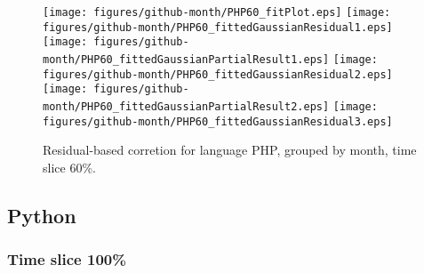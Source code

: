 \begin{figure}[t]
\centering
{}
{\texttt{[image: figures/github-month/PHP60\_fitPlot.eps]}}
{\texttt{[image: figures/github-month/PHP60\_fittedGaussianResidual1.eps]}}
{\texttt{[image: figures/github-month/PHP60\_fittedGaussianPartialResult1.eps]}}
{\texttt{[image: figures/github-month/PHP60\_fittedGaussianResidual2.eps]}}
{\texttt{[image: figures/github-month/PHP60\_fittedGaussianPartialResult2.eps]}}
{\texttt{[image: figures/github-month/PHP60\_fittedGaussianResidual3.eps]}}
\caption{Residual-based corretion for language PHP, grouped by month, time slice 60\%.}
\end{figure}


\FloatBarrier


\subsection{Python}

\subsubsection{Time slice 100\%}

